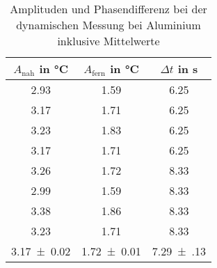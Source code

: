\begin{table}
\begin{center}
\begin{tabular}{c | c | c}
	$A_\text{nah}$ in \si{\celsius} & $A_\text{fern}$ in \si{\celsius} & $\Delta t$ in \si{\second} \\
\hline
	2.93 & 1.59 & 6.25 \\
	3.17 & 1.71 & 6.25 \\
	3.23 & 1.83 & 6.25 \\
	3.17 & 1.71 & 6.25 \\
	3.26 & 1.72 & 8.33 \\
	2.99 & 1.59 & 8.33 \\
	3.38 & 1.86 & 8.33 \\
	3.23 & 1.71 & 8.33 \\
\hline
	\SI{3.17(2)}{} & \SI{1.72(1)}{} & \SI{7.29(13)}{}
\end{tabular}
\end{center}
\caption{Amplituden und Phasendifferenz bei der dynamischen Messung bei Aluminium inklusive Mittelwerte}
\label{Amplituden Aluminium}
\end{table}
